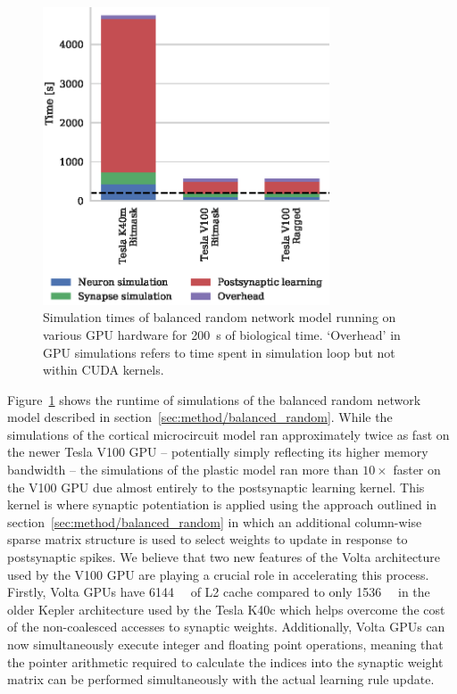 \documentclass[utf8]{frontiersSCNS} %
\begin{document}
\begin{figure}
    \begin{center}
        \includegraphics[width=85mm]{figures/stdp_performance}
    \end{center}
    \caption{Simulation times of balanced random network model running on various GPU hardware for \SI{200}{\second} of biological time.
    `Overhead' in GPU simulations refers to time spent in simulation loop but not within CUDA kernels.}
    \label{fig:stdp_performance}
\end{figure}

Figure~\ref{fig:stdp_performance} shows the runtime of simulations of the balanced random network model described in section~\ref{sec:method/balanced_random}.
While the simulations of the cortical microcircuit model ran approximately twice as fast on the newer Tesla V100 GPU -- potentially simply reflecting its higher memory bandwidth -- the simulations of the plastic model ran more than $10\times$ faster on the V100 GPU due almost entirely to the postsynaptic learning kernel.
This kernel is where synaptic potentiation is applied using the approach outlined in section~\ref{sec:method/balanced_random} in which an additional column-wise sparse matrix structure is used to select weights to update in response to postsynaptic spikes.
We believe that two new features of the Volta architecture~\citep{Nvidia2017} used by the V100 GPU are playing a crucial role in accelerating this process.
Firstly, Volta GPUs have \SI{6144}{\kibi\byte} of L2 cache compared to only \SI{1536}{\kibi\byte} in the older Kepler architecture used by the Tesla K40c which helps overcome the cost of the non-coalesced accesses to synaptic weights.
Additionally, Volta GPUs can now simultaneously execute integer and floating point operations, meaning that the pointer arithmetic required to calculate the indices into the synaptic weight matrix can be performed simultaneously with the actual learning rule update.
\end{document}
